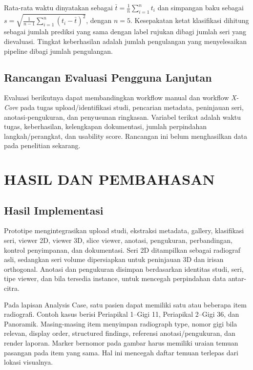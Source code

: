 \documentclass[12pt,a4paper,oneside]{report}
\newcommand{\xcore}{\textit{X-Core}}
\begin{document}
Rata-rata waktu dinyatakan sebagai $\bar{t}=\frac{1}{n}\sum_{i=1}^{n}t_i$ dan simpangan baku sebagai $s=\sqrt{\frac{1}{n-1}\sum_{i=1}^{n}(t_i-\bar{t})^2}$, dengan $n=5$. Kesepakatan ketat klasifikasi dihitung sebagai jumlah prediksi yang sama dengan label rujukan dibagi jumlah seri yang dievaluasi. Tingkat keberhasilan adalah jumlah pengulangan yang menyelesaikan pipeline dibagi jumlah pengulangan.

\section{Rancangan Evaluasi Pengguna Lanjutan}
Evaluasi berikutnya dapat membandingkan workflow manual dan workflow \xcore{} pada tugas upload/identifikasi studi, pencarian metadata, peninjauan seri, anotasi-pengukuran, dan penyusunan ringkasan. Variabel terikat adalah waktu tugas, keberhasilan, kelengkapan dokumentasi, jumlah perpindahan langkah/perangkat, dan usability score. Rancangan ini belum menghasilkan data pada penelitian sekarang.

\chapter{HASIL DAN PEMBAHASAN}
\label{bab:hasil-lengkap}
\section{Hasil Implementasi}
Prototipe mengintegrasikan upload studi, ekstraksi metadata, gallery, klasifikasi seri, viewer 2D, viewer 3D, slice viewer, anotasi, pengukuran, perbandingan, kontrol penyimpanan, dan dokumentasi. Seri 2D ditampilkan sebagai radiograf asli, sedangkan seri volume dipersiapkan untuk peninjauan 3D dan irisan orthogonal. Anotasi dan pengukuran disimpan berdasarkan identitas studi, seri, tipe viewer, dan bila tersedia instance, untuk mencegah perpindahan data antar-citra.

Pada lapisan Analysis Case, satu pasien dapat memiliki satu atau beberapa item radiografi. Contoh kasus berisi Periapikal 1--Gigi 11, Periapikal 2--Gigi 36, dan Panoramik. Masing-masing item menyimpan radiograph type, nomor gigi bila relevan, display order, structured findings, referensi anotasi/pengukuran, dan render laporan. Marker bernomor pada gambar harus memiliki uraian temuan pasangan pada item yang sama. Hal ini mencegah daftar temuan terlepas dari lokasi visualnya.
\end{document}
